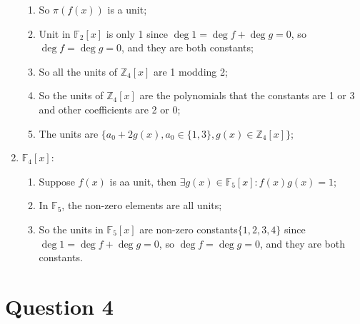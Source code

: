 \documentclass{article}
\begin{document}
\begin{enumerate}
\begin{enumerate}
        \item So $\pi(f(x))$ is a unit;
        \item Unit in $\mathbb{F}_2[x]$ is only 1 since $\deg 1=\deg f+\deg g=0$, so $\deg f=\deg g=0$, and they are both constants;
        \item So all the units of $\mathbb{Z}_4[x]$ are 1 modding 2;
        \item So the units of $\mathbb{Z}_4[x]$ are the polynomials that the constants are 1 or 3 and other coefficients are 2 or 0;
        \item The units are $\{a_0+2g(x),a_0\in\{1,3\},g(x)\in\mathbb{Z}_4[x]\}$;
    \end{enumerate}
    \item $\mathbb{F}_4[x]$:
    \begin{enumerate}
        \item Suppose $f(x)$ is aa unit, then $\exists g(x)\in\mathbb{F}_5[x]:f(x)g(x)=1$;
        \item In $\mathbb{F}_5$, the non-zero elements are all units;
        \item So the units in $\mathbb{F}_5[x]$ are non-zero constants$\{1,2,3,4\}$ since $\deg 1=\deg f+\deg g=0$, so $\deg f=\deg g=0$, and they are both constants.
    \end{enumerate}
\end{enumerate}

\newpage

\section*{Question 4}
\end{document}
